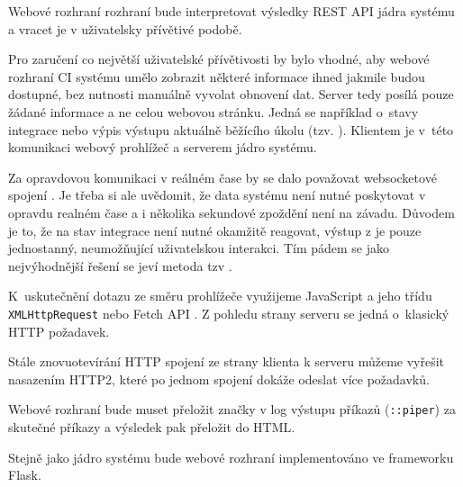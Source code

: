 Webové rozhraní rozhraní bude interpretovat výsledky REST API jádra systému a vracet je v uživatelsky přívětivé podobě.

Pro zaručení co největší uživatelské přívětivosti by bylo vhodné, aby webové rozhraní CI systému umělo zobrazit některé informace ihned jakmile budou dostupné, bez nutnosti manuálně vyvolat obnovení dat.
Server tedy posílá pouze žádané informace a ne celou webovou stránku.
Jedná se například o~stavy integrace nebo výpis výstupu aktuálně běžícího úkolu (tzv. ).
Klientem je v~této komunikaci webový prohlížeč a serverem jádro systému.

Za opravdovou komunikaci v reálném čase by se dalo považovat websocketové spojení \cite{websocket}.
Je třeba si ale uvědomit, že data systému není nutné poskytovat v opravdu realném čase a i několika sekundové zpoždění není na závadu.
Důvodem je to, že na stav integrace není nutné okamžitě reagovat, výstup z  je pouze jednostanný, neumožňující uživatelskou interakci.
Tím pádem se jako nejvýhodnější řešení se jeví metoda tzv .

K~uskutečnění dotazu ze směru prohlížeče využijeme JavaScript a jeho třídu \verb|XMLHttpRequest| nebo Fetch API \cite{fetch_api}.
Z pohledu strany serveru se jedná o~klasický HTTP požadavek.

Stále znovuotevírání HTTP spojení ze strany klienta k serveru můžeme vyřešit nasazením HTTP2, které po jednom spojení dokáže odeslat více požadavků.

Webové rozhraní bude muset přeložit značky v log výstupu příkazů (\verb|::piper|) za skutečné příkazy a výsledek pak přeložit do HTML.

Stejně jako jádro systému bude webové rozhraní implementováno ve frameworku Flask.



